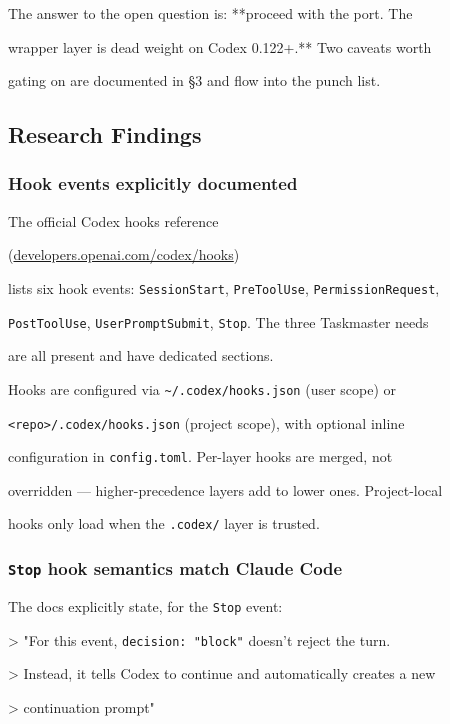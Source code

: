 \documentclass[twocolumn,10pt,letterpaper]{article}
\begin{document}
The answer to the open question is: **proceed with the port. The

wrapper layer is dead weight on Codex 0.122+.** Two caveats worth

gating on are documented in §3 and flow into the punch list.


\subsection{Research Findings}

\subsubsection{Hook events explicitly documented}

The official Codex hooks reference

(\href{https://developers.openai.com/codex/hooks}{developers.openai.com/codex/hooks})

lists six hook events: \texttt{SessionStart}, \texttt{PreToolUse}, \texttt{PermissionRequest},

\texttt{PostToolUse}, \texttt{UserPromptSubmit}, \texttt{Stop}. The three Taskmaster needs

are all present and have dedicated sections.


Hooks are configured via \texttt{\textasciitilde{}/\allowbreak .codex/\allowbreak hooks.json} (user scope) or

\texttt{<repo>/\allowbreak .codex/\allowbreak hooks.json} (project scope), with optional inline

configuration in \texttt{config.toml}. Per-layer hooks are merged, not

overridden — higher-precedence layers add to lower ones. Project-local

hooks only load when the \texttt{.codex/\allowbreak } layer is trusted.


\subsubsection{\texttt{Stop} hook semantics match Claude Code}

The docs explicitly state, for the \texttt{Stop} event:


> "For this event, \texttt{decision: "block"} doesn't reject the turn.

> Instead, it tells Codex to continue and automatically creates a new

> continuation prompt"
\end{document}
